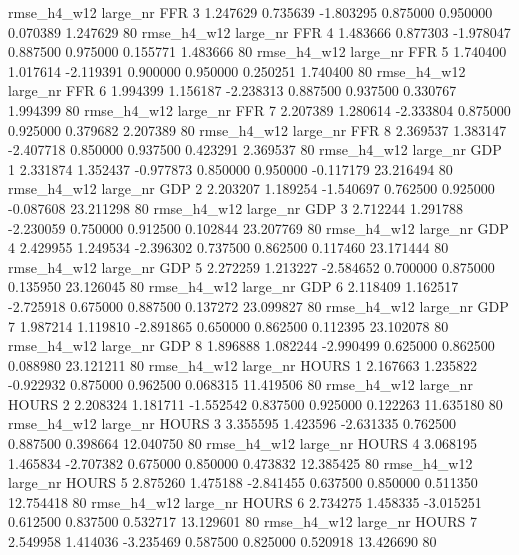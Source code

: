  rmse_h4_w12   large_nr      FFR                 3  1.247629  0.735639  -1.803295 0.875000 0.950000  0.070389    1.247629 80
 rmse_h4_w12   large_nr      FFR                 4  1.483666  0.877303  -1.978047 0.887500 0.975000  0.155771    1.483666 80
 rmse_h4_w12   large_nr      FFR                 5  1.740400  1.017614  -2.119391 0.900000 0.950000  0.250251    1.740400 80
 rmse_h4_w12   large_nr      FFR                 6  1.994399  1.156187  -2.238313 0.887500 0.937500  0.330767    1.994399 80
 rmse_h4_w12   large_nr      FFR                 7  2.207389  1.280614  -2.333804 0.875000 0.925000  0.379682    2.207389 80
 rmse_h4_w12   large_nr      FFR                 8  2.369537  1.383147  -2.407718 0.850000 0.937500  0.423291    2.369537 80
 rmse_h4_w12   large_nr      GDP                 1  2.331874  1.352437  -0.977873 0.850000 0.950000 -0.117179   23.216494 80
 rmse_h4_w12   large_nr      GDP                 2  2.203207  1.189254  -1.540697 0.762500 0.925000 -0.087608   23.211298 80
 rmse_h4_w12   large_nr      GDP                 3  2.712244  1.291788  -2.230059 0.750000 0.912500  0.102844   23.207769 80
 rmse_h4_w12   large_nr      GDP                 4  2.429955  1.249534  -2.396302 0.737500 0.862500  0.117460   23.171444 80
 rmse_h4_w12   large_nr      GDP                 5  2.272259  1.213227  -2.584652 0.700000 0.875000  0.135950   23.126045 80
 rmse_h4_w12   large_nr      GDP                 6  2.118409  1.162517  -2.725918 0.675000 0.887500  0.137272   23.099827 80
 rmse_h4_w12   large_nr      GDP                 7  1.987214  1.119810  -2.891865 0.650000 0.862500  0.112395   23.102078 80
 rmse_h4_w12   large_nr      GDP                 8  1.896888  1.082244  -2.990499 0.625000 0.862500  0.088980   23.121211 80
 rmse_h4_w12   large_nr    HOURS                 1  2.167663  1.235822  -0.922932 0.875000 0.962500  0.068315   11.419506 80
 rmse_h4_w12   large_nr    HOURS                 2  2.208324  1.181711  -1.552542 0.837500 0.925000  0.122263   11.635180 80
 rmse_h4_w12   large_nr    HOURS                 3  3.355595  1.423596  -2.631335 0.762500 0.887500  0.398664   12.040750 80
 rmse_h4_w12   large_nr    HOURS                 4  3.068195  1.465834  -2.707382 0.675000 0.850000  0.473832   12.385425 80
 rmse_h4_w12   large_nr    HOURS                 5  2.875260  1.475188  -2.841455 0.637500 0.850000  0.511350   12.754418 80
 rmse_h4_w12   large_nr    HOURS                 6  2.734275  1.458335  -3.015251 0.612500 0.837500  0.532717   13.129601 80
 rmse_h4_w12   large_nr    HOURS                 7  2.549958  1.414036  -3.235469 0.587500 0.825000  0.520918   13.426690 80
